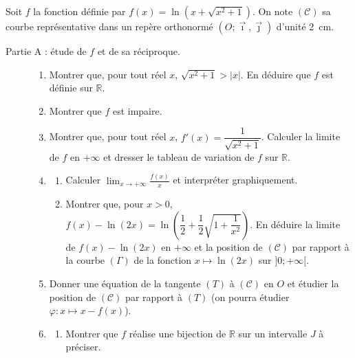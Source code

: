 \begin{exo}
\label{exo:pb argument sinus hyperbolique}
      Soit $f$ la fonction d\'efinie par $f(x) = \ln \left( x + \sqrt{x^2 + 1} \right)$.
      On note $(\mathscr{C})$ sa courbe repr\'esentative dans un rep\`ere orthonorm\'e $(O ; \vec{\imath} , \vec{\jmath})$
      d'unit\'e 2~cm.
      \begin{description}
            \item[Partie A : \'etude de $f$ et de sa r\'eciproque.]
                  \begin{enumerate}
                        \item Montrer que, pour tout r\'eel $x$, $\sqrt{x^2+1} > |x|$. En d\'eduire que $f$ est d\'efinie sur $\mathbb{R}$.
                        \item Montrer que $f$ est impaire.
                        \item Montrer que, pour tout r\'eel $x$, $f'(x) = \dfrac{1}{\sqrt{x^2+1}}$.
                              Calculer la limite de $f$ en $+\infty$ et dresser le tableau de variation de $f$ sur $\mathbb{R}$.
                        \item \begin{enumerate}
                                    \item Calculer $\displaystyle \lim_{x \to +\infty} \frac{f(x)}{x}$ et interpr\'eter graphiquement.
                                    \item Montrer que, pour $x > 0$, $f(x) - \ln(2x) = \ln \left( \dfrac{1}{2} + \dfrac{1}{2}\sqrt{1 + \dfrac{1}{x^2}} \right)$.
                                          En d\'eduire la limite de $f(x) - \ln (2x)$ en $+\infty$ et la position de $(\mathscr{C})$
                                          par rapport \`a la courbe $(\Gamma)$ de la fonction $x \mapsto \ln(2x)$ sur $]0 ; +\infty[$.
                              \end{enumerate}
                        \item Donner une \'equation de la tangente $(T)$ \`a $(\mathscr{C})$ en $O$ et
                              \'etudier la position de $(\mathscr{C})$ par rapport \`a $(T)$
                              (on pourra \'etudier $\varphi : x \mapsto x - f(x)$).
                        \item \begin{enumerate}
                                    \item Montrer que $f$ r\'ealise une bijection de $\mathbb{R}$ sur un intervalle $J$ \`a pr\'eciser.

\end{enumerate}
\end{enumerate}
\end{description}
\end{exo}
